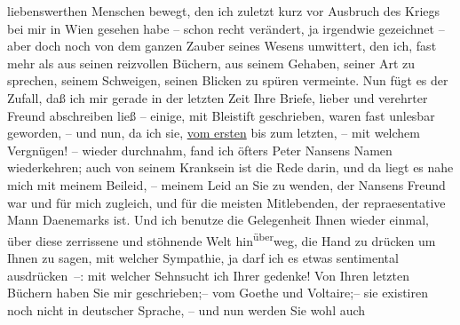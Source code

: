 \begin{ledgroupsized}[t]{13cm}
               liebenswerthen Menschen bewegt, den ich zuletzt kurz vor Ausbruch des Kriegs bei mir
               in Wien gesehen habe – schon recht verändert, ja
               irgendwie gezeichnet – aber doch noch von dem ganzen Zauber seines Wesens umwittert,
               den ich, fast mehr als aus seinen reizvollen Büchern, aus seinem Gehaben, seiner Art
               zu sprechen, seinem Schweigen, seinen Blicken zu spüren vermeinte. Nun fügt es der
               Zufall, daß ich mir gerade in der letzten Zeit Ihre Briefe, lieber und verehrter
               Freund abschreiben ließ – einige, mit Bleistift geschrieben, waren fast unlesbar
               geworden, – und nun, da ich sie, \uline{vom ersten} bis zum
               letzten,  – mit welchem Vergnügen! – wieder
               durchnahm, fand ich öfters Peter Nansens Namen
               wiederkehren; auch von seinem Kranksein ist die Rede darin, und da liegt es nahe mich
               mit meinem Beileid, – meinem Leid an Sie zu wenden, der Nansens Freund war und für mich zugleich, und für die meisten
               Mitlebenden, {\pb}der repraesentative Mann Daenemarks ist. Und ich benutze die Gelegenheit
               Ihnen wieder einmal, über diese zerrissene und stöhnende Welt hin\substVorne{}\textsuperscript{über}\substDazwischen{}weg\substHinten{}, die Hand zu drücken um Ihnen zu sagen, mit welcher Sympathie, ja darf ich
               es etwas sentimental ausdrücken –: mit welcher Sehnsucht ich Ihrer gedenke! Von Ihren
               letzten Büchern haben Sie mir geschrieben;– vom Goethe und Voltaire;– sie existiren noch nicht in deutscher Sprache, – und nun werden Sie wohl auch

\end{ledgroupsized}
